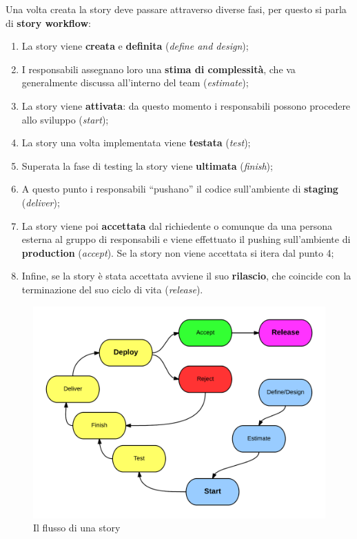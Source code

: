 Una volta creata la story deve passare attraverso diverse fasi, per questo si parla di \textbf{story workflow}:

\begin{enumerate}

\item La story viene \textbf{creata} e \textbf{definita} (\textit{define and design});
\item I responsabili assegnano loro una \textbf{stima di complessità}, che va generalmente discussa all'interno del team (\textit{estimate});
\item La story viene \textbf{attivata}: da questo momento i responsabili possono procedere allo sviluppo (\textit{start});
\item La story una volta implementata viene \textbf{testata} (\textit{test});
\item Superata la fase di testing la story viene \textbf{ultimata} (\textit{finish});
\item A questo punto i responsabili ``pushano'' il codice sull'ambiente di \textbf{staging} (\textit{deliver});
\item La story viene poi \textbf{accettata} dal richiedente o comunque da una persona esterna al gruppo di responsabili e viene effettuato il pushing sull'ambiente di \textbf{production} (\textit{accept}). Se la story non viene accettata si itera dal punto 4;
\item Infine, se la story è stata accettata avviene il suo \textbf{rilascio}, che coincide con la terminazione del suo ciclo di vita (\textit{release}).

\end{enumerate}

\begin{figure}[htpd]
\centering
\includegraphics[width=\textwidth]{../immagini/story-workflow}
\caption{Il flusso di una story}
\end{figure}

